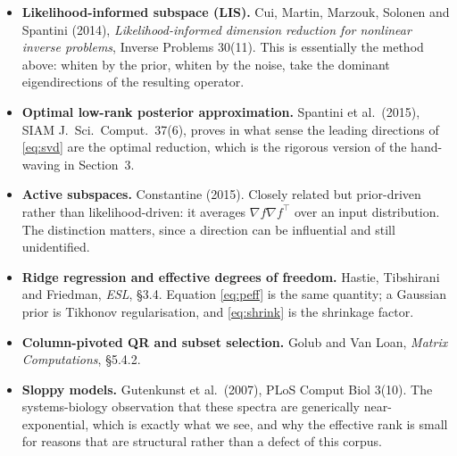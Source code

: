 \documentclass[11pt]{article}
\begin{document}
\begin{itemize}
  \item \textbf{Likelihood-informed subspace (LIS).} Cui, Martin, Marzouk,
        Solonen and Spantini (2014), \emph{Likelihood-informed dimension
        reduction for nonlinear inverse problems}, Inverse Problems 30(11).
        This is essentially the method above: whiten by the prior, whiten by the
        noise, take the dominant eigendirections of the resulting operator.
  \item \textbf{Optimal low-rank posterior approximation.} Spantini et al.\
        (2015), SIAM J.\ Sci.\ Comput.\ 37(6), proves in what sense the leading
        directions of \eqref{eq:svd} are the optimal reduction, which is the
        rigorous version of the hand-waving in Section~3.
  \item \textbf{Active subspaces.} Constantine (2015). Closely related but
        prior-driven rather than likelihood-driven: it averages
        $\nabla f \nabla f^{\top}$ over an input distribution. The distinction
        matters, since a direction can be influential and still unidentified.
  \item \textbf{Ridge regression and effective degrees of freedom.} Hastie,
        Tibshirani and Friedman, \emph{ESL}, §3.4. Equation \eqref{eq:peff} is
        the same quantity; a Gaussian prior is Tikhonov regularisation, and
        \eqref{eq:shrink} is the shrinkage factor.
  \item \textbf{Column-pivoted QR and subset selection.} Golub and Van Loan,
        \emph{Matrix Computations}, §5.4.2.
  \item \textbf{Sloppy models.} Gutenkunst et al.\ (2007), PLoS Comput Biol
        3(10). The systems-biology observation that these spectra are generically
        near-exponential, which is exactly what we see, and why the effective
        rank is small for reasons that are structural rather than a defect of
        this corpus.
\end{itemize}
\end{document}
